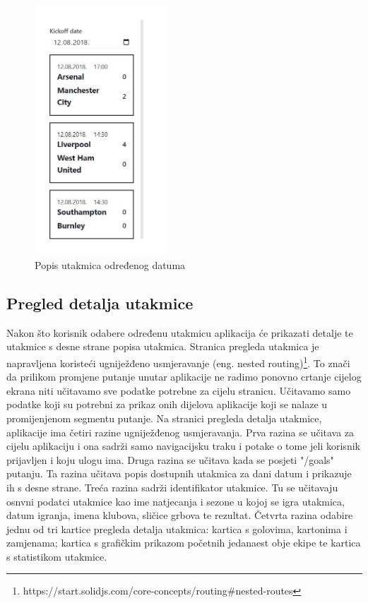\documentclass[times, utf8, zavrsni]{fer}
\begin{document}
\begin{figure}[htb]
\centering
\includegraphics[width=5cm]{images/game-list.jpg}
\caption{Popis utakmica određenog datuma}
\label{fig:games-list}
\end{figure}

\subsection{Pregled detalja utakmice}

Nakon što korisnik odabere određenu utakmicu aplikacija će prikazati detalje te utakmice s desne strane popisa utakmica.
Stranica pregleda utakmica je napravljena koristeći ugniježđeno usmjeravanje (eng. nested routing)\footnote{https://start.solidjs.com/core-concepts/routing\#nested-routes}.
To znači da prilikom promjene putanje unutar aplikacije ne radimo ponovno crtanje cijelog ekrana niti učitavamo sve podatke potrebne za cijelu stranicu.
Učitavamo samo podatke koji su potrebni za prikaz onih dijelova aplikacije koji se nalaze u promijenjenom segmentu putanje.
Na stranici pregleda detalja utakmice, aplikacije ima četiri razine ugniježđenog usmjeravanja. Prva razina se učitava za cijelu aplikaciju i ona sadrži samo navigacijsku traku i potake o tome jeli korisnik prijavljen i koju ulogu ima.
Druga razina se učitava kada se posjeti "/goals" putanju. Ta razina učitava popis dostupnih utakmica za dani datum i prikazuje ih s desne strane.
Treća razina sadrži identifikator utakmice. Tu se učitavaju osnvni podatci utakmice kao ime natjecanja i sezone u kojoj se igra utakmica, datum igranja, imena klubova, sličice grbova te rezultat.
Četvrta razina odabire jednu od tri kartice pregleda detalja utakmica: kartica s golovima, kartonima i zamjenama; kartica s grafičkim prikazom početnih jedanaest obje ekipe te kartica s statistikom utakmice.
\end{document}
